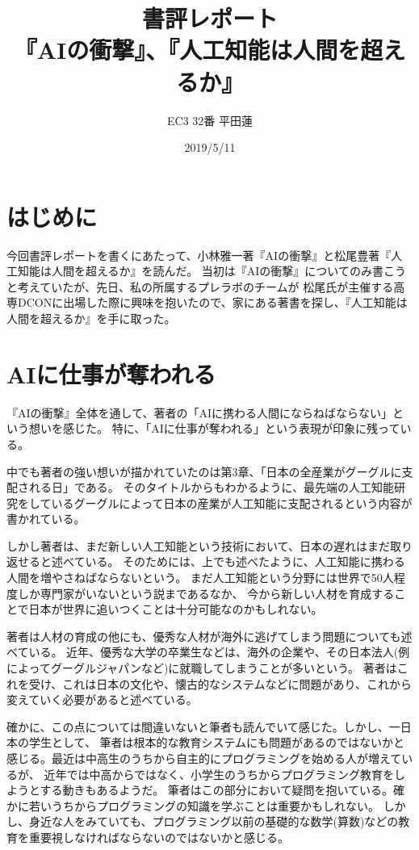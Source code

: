 \documentclass[uplatex]{jsarticle}
\title{書評レポート\\『AIの衝撃』、『人工知能は人間を超えるか』}
\author{EC3 32番 平田蓮}
\date{2019/5/11}
\begin{document}
\maketitle
\section{はじめに}
    今回書評レポートを書くにあたって、小林雅一著『AIの衝撃』と松尾豊著『人工知能は人間を超えるか』を読んだ。
    当初は『AIの衝撃』についてのみ書こうと考えていたが、先日、私の所属するプレラボのチームが
    松尾氏が主催する高専DCONに出場した際に興味を抱いたので、家にある著書を探し、『人工知能は人間を超えるか』を手に取った。

\section{AIに仕事が奪われる}
    『AIの衝撃』全体を通して、著者の「AIに携わる人間にならねばならない」という想いを感じた。
    特に、「AIに仕事が奪われる」という表現が印象に残っている。

    中でも著者の強い想いが描かれていたのは第3章、「日本の全産業がグーグルに支配される日」である。
    そのタイトルからもわかるように、最先端の人工知能研究をしているグーグルによって日本の産業が人工知能に支配されるという内容が書かれている。

    しかし著者は、まだ新しい人工知能という技術において、日本の遅れはまだ取り返せると述べている。
    そのためには、上でも述べたように、人工知能に携わる人間を増やさねばならないという。
    まだ人工知能という分野には世界で50人程度しか専門家がいないという説まであるなか、
    今から新しい人材を育成することで日本が世界に追いつくことは十分可能なのかもしれない。

    著者は人材の育成の他にも、優秀な人材が海外に逃げてしまう問題についても述べている。
    近年、優秀な大学の卒業生などは、海外の企業や、その日本法人(例によってグーグルジャパンなど)に就職してしまうことが多いという。
    著者はこれを受け、これは日本の文化や、懐古的なシステムなどに問題があり、これから変えていく必要があると述べている。

    確かに、この点については間違いないと筆者も読んでいて感じた。しかし、一日本の学生として、
    筆者は根本的な教育システムにも問題があるのではないかと感じる。最近は中高生のうちから自主的にプログラミングを始める人が増えているが、
    近年では中高からではなく、小学生のうちからプログラミング教育をしようとする動きもあるようだ。
    筆者はこの部分において疑問を抱いている。確かに若いうちからプログラミングの知識を学ぶことは重要かもしれない。
    しかし、身近な人をみていても、プログラミング以前の基礎的な数学(算数)などの教育を重要視しなければならないのではないかと感じる。
\end{document}
